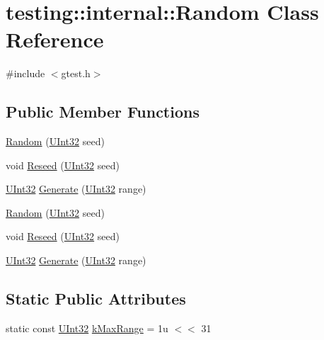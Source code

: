 \hypertarget{classtesting_1_1internal_1_1_random}{\section{testing\-:\-:internal\-:\-:Random Class Reference}
\label{classtesting_1_1internal_1_1_random}
}


{\ttfamily \#include $<$gtest.\-h$>$}

\subsection*{Public Member Functions}
\begin{DoxyCompactItemize}
\item 
\hyperlink{classtesting_1_1internal_1_1_random_a6e112be5e7cce00551f6383025f69460}{Random} (\hyperlink{namespacetesting_1_1internal_a436defbb8e92c8e94e33ebcc86f278ba}{U\-Int32} seed)
\item 
void \hyperlink{classtesting_1_1internal_1_1_random_adf2f24199318a46f885c78f50d89a69e}{Reseed} (\hyperlink{namespacetesting_1_1internal_a436defbb8e92c8e94e33ebcc86f278ba}{U\-Int32} seed)
\item 
\hyperlink{namespacetesting_1_1internal_a436defbb8e92c8e94e33ebcc86f278ba}{U\-Int32} \hyperlink{classtesting_1_1internal_1_1_random_a9315b7fb621cbcfdf92ed4b5e584c0db}{Generate} (\hyperlink{namespacetesting_1_1internal_a436defbb8e92c8e94e33ebcc86f278ba}{U\-Int32} range)
\item 
\hyperlink{classtesting_1_1internal_1_1_random_a6e112be5e7cce00551f6383025f69460}{Random} (\hyperlink{namespacetesting_1_1internal_a436defbb8e92c8e94e33ebcc86f278ba}{U\-Int32} seed)
\item 
void \hyperlink{classtesting_1_1internal_1_1_random_adf2f24199318a46f885c78f50d89a69e}{Reseed} (\hyperlink{namespacetesting_1_1internal_a436defbb8e92c8e94e33ebcc86f278ba}{U\-Int32} seed)
\item 
\hyperlink{namespacetesting_1_1internal_a436defbb8e92c8e94e33ebcc86f278ba}{U\-Int32} \hyperlink{classtesting_1_1internal_1_1_random_a9315b7fb621cbcfdf92ed4b5e584c0db}{Generate} (\hyperlink{namespacetesting_1_1internal_a436defbb8e92c8e94e33ebcc86f278ba}{U\-Int32} range)
\end{DoxyCompactItemize}
\subsection*{Static Public Attributes}
\begin{DoxyCompactItemize}
\item 
static const \hyperlink{namespacetesting_1_1internal_a436defbb8e92c8e94e33ebcc86f278ba}{U\-Int32} \hyperlink{classtesting_1_1internal_1_1_random_ad378599ead1173525f1d44b458a3450a}{k\-Max\-Range} = 1u $<$$<$ 31
\end{DoxyCompactItemize}


